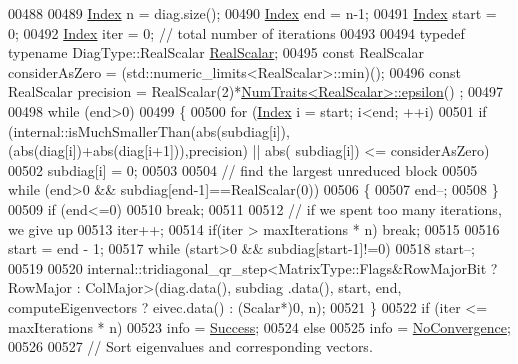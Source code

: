 \begin{DoxyCode}
00488 
00489   \hyperlink{group___eigenvalues___module_a8a59ab7734b6eae2754fd78bc7c3a360}{Index} n = diag.size();
00490   \hyperlink{group___eigenvalues___module_a8a59ab7734b6eae2754fd78bc7c3a360}{Index} end = n-1;
00491   \hyperlink{group___eigenvalues___module_a8a59ab7734b6eae2754fd78bc7c3a360}{Index} start = 0;
00492   \hyperlink{group___eigenvalues___module_a8a59ab7734b6eae2754fd78bc7c3a360}{Index} iter = 0; \textcolor{comment}{// total number of iterations}
00493   
00494   \textcolor{keyword}{typedef} \textcolor{keyword}{typename} DiagType::RealScalar \hyperlink{group___eigenvalues___module_a5dae5f422a3c71060e6bd31332bf64fd}{RealScalar};
00495   \textcolor{keyword}{const} RealScalar considerAsZero = (std::numeric\_limits<RealScalar>::min)();
00496   \textcolor{keyword}{const} RealScalar precision = RealScalar(2)*\hyperlink{group___core___module_struct_eigen_1_1_num_traits}{NumTraits<RealScalar>::epsilon}()
      ;
00497   
00498   \textcolor{keywordflow}{while} (end>0)
00499   \{
00500     \textcolor{keywordflow}{for} (\hyperlink{group___eigenvalues___module_a8a59ab7734b6eae2754fd78bc7c3a360}{Index} i = start; i<end; ++i)
00501       \textcolor{keywordflow}{if} (internal::isMuchSmallerThan(abs(subdiag[i]),(abs(diag[i])+abs(diag[i+1])),precision) || abs(
      subdiag[i]) <= considerAsZero)
00502         subdiag[i] = 0;
00503 
00504     \textcolor{comment}{// find the largest unreduced block}
00505     \textcolor{keywordflow}{while} (end>0 && subdiag[end-1]==RealScalar(0))
00506     \{
00507       end--;
00508     \}
00509     \textcolor{keywordflow}{if} (end<=0)
00510       \textcolor{keywordflow}{break};
00511 
00512     \textcolor{comment}{// if we spent too many iterations, we give up}
00513     iter++;
00514     \textcolor{keywordflow}{if}(iter > maxIterations * n) \textcolor{keywordflow}{break};
00515 
00516     start = end - 1;
00517     \textcolor{keywordflow}{while} (start>0 && subdiag[start-1]!=0)
00518       start--;
00519 
00520     internal::tridiagonal\_qr\_step<MatrixType::Flags&RowMajorBit ? RowMajor : ColMajor>(diag.data(), subdiag
      .data(), start, end, computeEigenvectors ? eivec.data() : (Scalar*)0, n);
00521   \}
00522   \textcolor{keywordflow}{if} (iter <= maxIterations * n)
00523     info = \hyperlink{group__enums_gga85fad7b87587764e5cf6b513a9e0ee5ea52581b035f4b59c203b8ff999ef5fcea}{Success};
00524   \textcolor{keywordflow}{else}
00525     info = \hyperlink{group__enums_gga85fad7b87587764e5cf6b513a9e0ee5eaba1c8763d1179778070f365ecc4157a8}{NoConvergence};
00526 
00527   \textcolor{comment}{// Sort eigenvalues and corresponding vectors.}

\end{DoxyCode}
